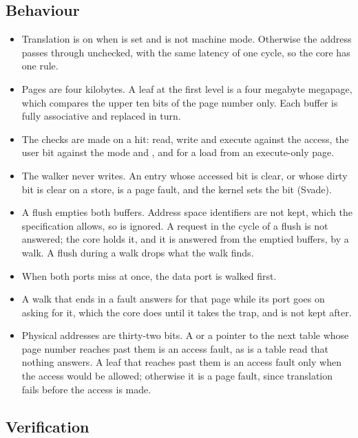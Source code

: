 
\subsection*{Behaviour}

\begin{itemize}
\item Translation is on when  is set and  is
not machine mode. Otherwise the address passes through unchecked, with
the same latency of one cycle, so the core has one rule.
\item Pages are four kilobytes. A leaf at the first level is a four
megabyte megapage, which compares the upper ten bits of the page
number only. Each buffer is fully associative and replaced in turn.
\item The checks are made on a hit: read, write and execute against the
access, the user bit against the mode and , and 
for a load from an execute-only page.
\item The walker never writes. An entry whose accessed bit is clear, or
whose dirty bit is clear on a store, is a page fault, and the kernel
sets the bit (Svade).
\item A flush empties both buffers. Address space identifiers are not
kept, which the specification allows, so  is ignored.
A request in the cycle of a flush is not answered; the core holds it,
and it is answered from the emptied buffers, by a walk. A flush during
a walk drops what the walk finds.
\item When both ports miss at once, the data port is walked first.
\item A walk that ends in a fault answers for that page while its port
goes on asking for it, which the core does until it takes the trap,
and is not kept after.
\item Physical addresses are thirty-two bits. A  or a
pointer to the next table whose page number reaches past them is an
access fault, as is a table read that nothing answers. A leaf that
reaches past them is an access fault only when the access would be
allowed; otherwise it is a page fault, since translation fails before
the access is made.
\end{itemize}

\subsection*{Verification}

